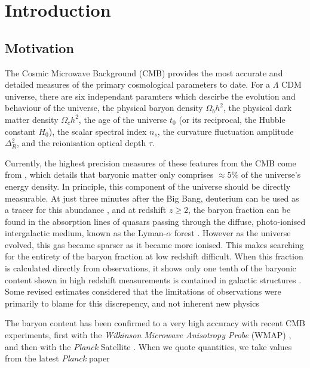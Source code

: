 \chapter{Introduction}

\section{Motivation}
The Cosmic Microwave Background (CMB) provides the most accurate and detailed measures of the primary cosmological parameters to date. For a $\Lambda$ CDM universe, there are six independant paramters which descirbe the evolution and behaviour of the universe, the physical baryon density $\Omega_b h^2$, the physical dark matter density $\Omega_c h^2$, the age of the universe $t_0$ (or its reciprocal, the Hubble constant $H_0$), the scalar spectral index $n_s$, the curvature fluctuation amplitude $\Delta_R^2$, and the reionisation optical depth $\tau$. 

Currently, the highest precision measures of these features from the CMB come from \cite{2018arXiv180706209P}, which details that baryonic matter only comprises $\approx 5 \% $ of the universe's energy density. In principle, this component of the universe should be directly measurable. At just three minutes after the Big Bang, deuterium can be used as a tracer for this abundance \citep{2007ARNPS..57..463S}, and at redshift $z \geqslant 2$, the baryon fraction can be found in the absorption lines of quasars passing through the diffuse, photo-ionised intergalactic medium, known as the Lyman-$\alpha$ forest \citep{1997ApJ...490..564W}. However as the universe evolved, this gas became sparser as it became more ionised. This makes searching for the entirety of the baryon fraction at low redshift difficult. When this fraction is calculated directly from observations, it shows only one tenth of the baryonic content shown in high redshift measurements is contained in galactic structures \citep{1992MNRAS.258P..14P}. Some revised estimates considered that the limitations of observations were primarily to blame for this discrepency, and not inherent new physics \citep{1994MNRAS.267...13B, 1998ApJ...503..518F}

The baryon content has been confirmed to a very high accuracy with recent CMB experiments, first with the \textit{Wilkinson Microwave Anisotropy Probe} (WMAP) \citep{2007ApJS..170..377S}, and then with the \textit{Planck} Satellite \citep{2018arXiv180706209P}. When we quote quantities, we take values from the latest \textit{Planck} paper



